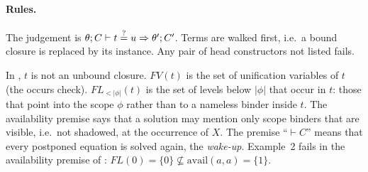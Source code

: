 \paragraph{Rules.} The judgement is $\theta;C\vdash t\stackrel{?}{=} u\Rightarrow\theta';C'$. Terms are walked
first, i.e.\ a bound closure is replaced by its instance. Any pair of head constructors not listed
fails.
\begin{fullwidth}
\end{fullwidth}
In , $t$ is not an unbound closure. $FV(t)$ is the set of unification variables of
$t$ (the occurs check). $FL_{<|\phi|}(t)$ is the set of levels below $|\phi|$ that occur in $t$: those
that point into the scope $\phi$ rather than to a nameless binder inside $t$. The availability premise
says that a solution may mention only scope binders that are visible, i.e.\ not shadowed, at the
occurrence of $X$. The premise \enquote{$\vdash C$} means that every postponed equation is solved
again, the \emph{wake-up}. Example~2 fails in the availability premise of :
$FL(0)=\{0\}\not\subseteq\mathrm{avail}(a,a)=\{1\}$.


